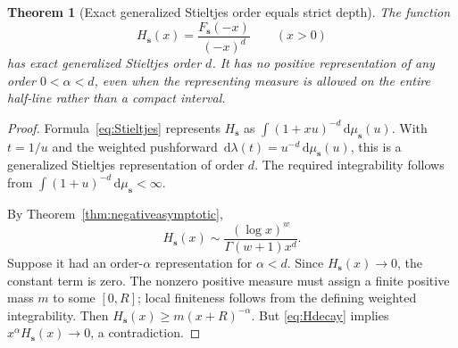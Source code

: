 \documentclass[11pt]{article}
\numberwithin{equation}{section}
\newtheorem{theorem}{Theorem}[section]
\theoremstyle{definition}
\theoremstyle{remark}
\newcommand{\dd}{\,\mathrm d}
\newcommand{\sv}{\boldsymbol s}
\begin{document}
\begin{theorem}[Exact generalized Stieltjes order equals strict depth]
\label{thm:exactorder}
The function
\begin{equation}\label{eq:Hdepth}
 H_{\sv}(x)=\frac{F_{\sv}(-x)}{(-x)^d}\qquad(x>0)
\end{equation}
has exact generalized Stieltjes order $d$. It has no positive
representation of any order $0<\alpha<d$, even when the representing
measure is allowed on the entire half-line rather than a compact interval.
\end{theorem}
\begin{proof}
Formula~\eqref{eq:Stieltjes} represents $H_{\sv}$ as
$\int(1+xu)^{-d}\dd\mu_{\sv}(u)$. With $t=1/u$ and the weighted
pushforward $\dd\lambda(t)=u^{-d}\dd\mu_{\sv}(u)$, this is a generalized
Stieltjes representation of order $d$. The required integrability follows
from $\int(1+u)^{-d}\dd\mu_{\sv}<\infty$.

By Theorem~\ref{thm:negativeasymptotic},
\begin{equation}\label{eq:Hdecay}
 H_{\sv}(x)\sim\frac{(\log x)^w}{\Gamma(w+1)x^d}.
\end{equation}
Suppose it had an order-$\alpha$ representation for $\alpha<d$.
Since $H_{\sv}(x)\to0$, the constant term is zero. The nonzero positive
measure must assign a finite positive mass $m$ to some $[0,R]$;
local finiteness follows from the defining weighted integrability.
Then $H_{\sv}(x)\ge m(x+R)^{-\alpha}$. But \eqref{eq:Hdecay} implies
$x^\alpha H_{\sv}(x)\to0$, a contradiction.
\end{proof}
\end{document}
